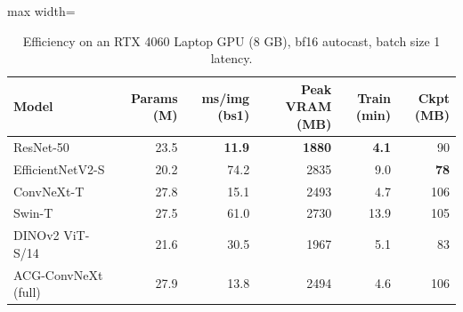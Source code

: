 \begin{table}[t]
\centering
\caption{Efficiency on an RTX 4060 Laptop GPU (8 GB), bf16 autocast, batch size 1 latency.}
\label{tab:profiling}
\small
\begin{adjustbox}{max width=\linewidth}\begin{tabular}{lrrrrr}
\toprule
Model & Params (M) & ms/img (bs1) & Peak VRAM (MB) & Train (min) & Ckpt (MB) \\
\midrule
ResNet-50 & 23.5 & \textbf{11.9} & \textbf{1880} & \textbf{4.1} & 90 \\
EfficientNetV2-S & 20.2 & 74.2 & 2835 & 9.0 & \textbf{78} \\
ConvNeXt-T & 27.8 & 15.1 & 2493 & 4.7 & 106 \\
Swin-T & 27.5 & 61.0 & 2730 & 13.9 & 105 \\
DINOv2 ViT-S/14 & 21.6 & 30.5 & 1967 & 5.1 & 83 \\
ACG-ConvNeXt (full) & 27.9 & 13.8 & 2494 & 4.6 & 106 \\
\bottomrule
\end{tabular}\end{adjustbox}
\end{table}